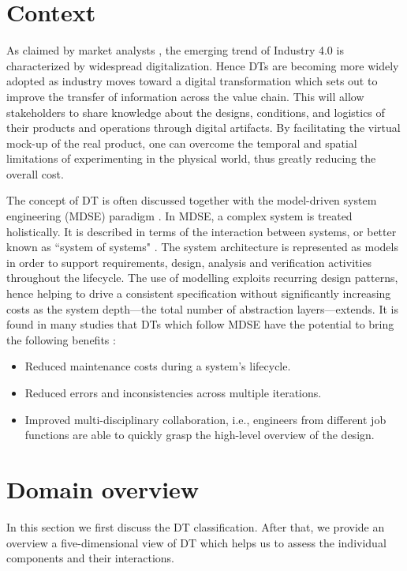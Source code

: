 \section{Context}\label{sec:context}
As claimed by market analysts \cite{pwc2014, ibm}, the emerging trend of Industry 4.0 is characterized by widespread digitalization. Hence DTs are becoming more widely adopted as industry moves toward a digital transformation which sets out to improve the transfer of information across the value chain. This will allow stakeholders to share knowledge about the designs, conditions, and logistics of their products and operations through digital artifacts. By facilitating the virtual mock-up of the real product, one can overcome the temporal and spatial limitations of experimenting in the physical world, thus greatly reducing the overall cost.

The concept of DT is often discussed together with the model-driven system engineering (MDSE) paradigm \cite{Bordeleau2020}. In MDSE, a complex system is treated holistically. It is described in terms of the interaction between systems, or better known as ``system of systems" \cite{Kossiakoff2011}. The system architecture is represented as models in order to support requirements, design, analysis and verification activities throughout the lifecycle. The use of modelling exploits recurring design patterns, hence helping to drive a consistent specification without significantly increasing costs as the system depth---the total number of abstraction layers---extends. It is found in many studies that DTs which follow MDSE have the potential to bring the following benefits \cite{Boschert2016, Macchi2018, Lim2019, Ansari2020, Cai2021, Gurdur2022}:
\begin{itemize}
  \item Reduced maintenance costs during a system's lifecycle.
  \item Reduced errors and inconsistencies across multiple iterations. 
  \item Improved multi-disciplinary collaboration, i.e., engineers from different job functions are able to quickly grasp the high-level overview of the design.
\end{itemize}

\section{Domain overview}\label{sec:overview}
In this section we first discuss the DT classification. After that, we provide an overview a five-dimensional view of DT which helps us to assess the individual components and their interactions.
